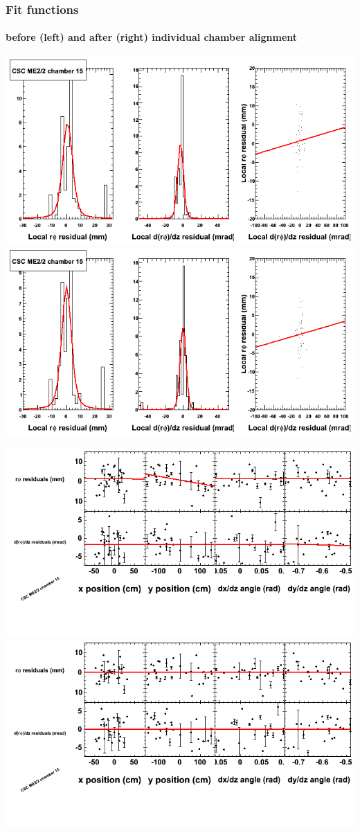 \documentclass[compress]{beamer}
\begin{document}
\begin{frame}
\frametitle{Fit functions}
\framesubtitle{before (left) and after (right) individual chamber alignment}
\includegraphics[width=0.5\linewidth]{ringfits_3dof/beforefit_MEp22_15_bellcurve.png} \includegraphics[width=0.5\linewidth]{ringfits_3dof/afterfit_MEp22_15_bellcurve.png}

\includegraphics[width=0.5\linewidth]{ringfits_3dof/beforefit_MEp22_15_polynomials.png} \includegraphics[width=0.5\linewidth]{ringfits_3dof/afterfit_MEp22_15_polynomials.png}
\end{frame}
\end{document}

